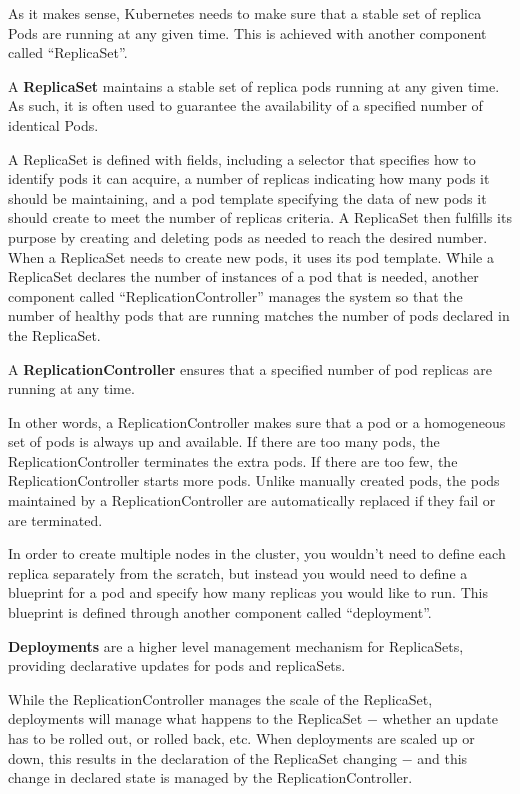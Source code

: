 
As it makes sense, Kubernetes needs to make sure that a stable set of replica Pods are running at any given time.
This is achieved with another component called ``ReplicaSet''.

\bd[ReplicaSet]
A \textbf{ReplicaSet} maintains a stable set of replica pods running at any given time. As such, it is often used to
guarantee the availability of a specified number of identical Pods.
\ed

A ReplicaSet is defined with fields, including a selector that specifies how to identify pods it can acquire, a
number of replicas indicating how many pods it should be maintaining, and a pod template specifying the data of new
pods it should create to meet the number of replicas criteria. A ReplicaSet then fulfills its purpose by creating and
deleting pods as needed to reach the desired number. When a ReplicaSet needs to create new pods, it uses its pod
template. \v

While a ReplicaSet declares the number of instances of a pod that is needed, another component called
``ReplicationController'' manages the system so that the number of healthy pods that are running matches the number
of pods declared in the ReplicaSet.

\bd[ReplicationController]
A \textbf{ReplicationController} ensures that a specified number of pod replicas are running at any time.
\ed

In other words, a ReplicationController makes sure that a pod or a homogeneous set of pods is always up and available.
If there are too many pods, the ReplicationController terminates the extra pods. If there are too few, the
ReplicationController starts more pods. Unlike manually created pods, the pods maintained by a ReplicationController
are automatically replaced if they fail or are terminated.


In order to create multiple nodes in the cluster, you wouldn't need to define each replica separately from the
scratch, but instead you would need to define a blueprint for a pod and specify how many replicas you would like to
run. This blueprint is defined through another component called ``deployment''.

\bd[Deployment]
\textbf{Deployments} are a higher level management mechanism for ReplicaSets, providing declarative updates for pods and
replicaSets.
\ed

While the ReplicationController manages the scale of the ReplicaSet, deployments will manage what happens to the
ReplicaSet $-$ whether an update has to be rolled out, or rolled back, etc. When deployments are scaled up or down,
this results in the declaration of the ReplicaSet changing $-$ and this change in declared state is managed by the
ReplicationController.

